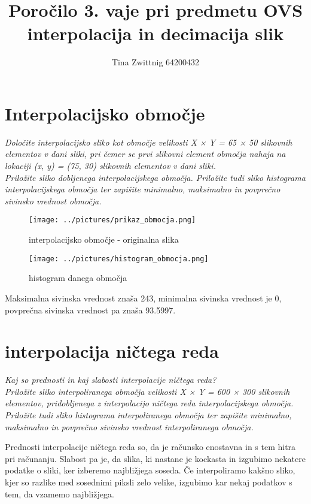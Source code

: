 \documentclass[12pt,a4paper]{article}
\author{Tina Zwittnig 64200432}
\title{Poročilo 3. vaje pri predmetu OVS \\ interpolacija in decimacija slik}
\begin{document}
\maketitle
\pagebreak
\section{Interpolacijsko območje}
\emph{Določite interpolacijsko sliko kot območje velikosti X × Y = 65 × 50 slikovnih elementov v
dani sliki, pri čemer se prvi slikovni element območja nahaja na lokaciji (x, y) = (75, 30)
slikovnih elementov v dani sliki.\\
Priložite sliko dobljenega interpolacijskega območja. Priložite tudi sliko histograma
interpolacijskega območja ter zapišite minimalno, maksimalno in povprečno sivinsko
vrednost območja.\\}
\begin{figure}[h!]
\centering
\texttt{[image: ../pictures/prikaz\_obmocja.png]}
\caption{interpolacijsko območje - originalna slika}
\end{figure}

\begin{figure}[h!]
\centering
\texttt{[image: ../pictures/histogram\_obmocja.png]}
\caption{histogram danega območja}
\end{figure}

Maksimalna sivinska vrednost znaša 243, minimalna sivinska vrednost je 0, povprečna sivinska vrednost pa znaša 93.5997.


\section{interpolacija ničtega reda}
\emph{Kaj so prednosti in kaj slabosti interpolacije ničtega reda?\\
Priložite sliko interpoliranega območja velikosti X × Y = 600 × 300 slikovnih elementov,
pridobljenega z interpolacijo ničtega reda interpolacijskega območja. \\
Priložite tudi sliko
histograma interpoliranega območja ter zapišite minimalno, maksimalno in povprečno
sivinsko vrednost interpoliranega območja.\\}

Prednosti interpolacije ničtega reda so, da je računsko enostavna in s tem hitra pri računanju. Slabost pa je, da slika, ki nastane je kockasta in izgubimo nekatere podatke o sliki, ker izberemo najbližjega soseda. Če interpoliramo kakšno sliko, kjer so razlike med sosednimi piksli zelo velike, izgubimo kar nekaj podatkov s tem, da vzamemo najbližjega.  \\
\end{document}

